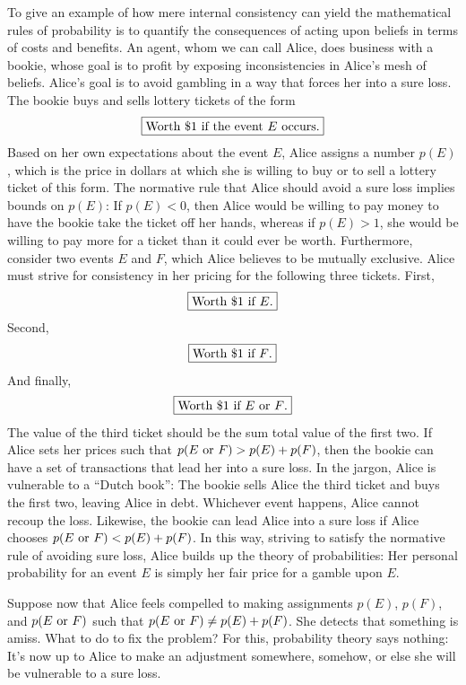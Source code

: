 \documentclass[aps,pra,superscriptaddress,10pt,tightenlines,twocolumn,nofootinbib]{revtex4}
\newcommand{\ticket}[1]{\boxed{\hbox{#1}}}
\begin{document}
To give an example of how mere internal consistency can yield the mathematical rules of probability is to quantify the consequences of acting upon beliefs in terms of costs and benefits.  An agent, whom we can call Alice, does business with a bookie, whose goal is to profit by exposing inconsistencies in Alice's mesh of beliefs.  Alice's goal is to avoid gambling in a way that forces her into a sure loss.  The bookie buys and sells lottery tickets of the form
\begin{equation}
\ticket{Worth \$1 if the event $E$ occurs.}
\end{equation}
Based on her own expectations about the event $E$, Alice assigns a number $p(E)$, which is the price in dollars at which she is willing to buy or to sell a lottery ticket of this form.  The normative rule that Alice should avoid a sure loss implies bounds on $p(E)$: If $p(E) < 0$, then Alice would be willing to pay money to have the bookie take the ticket off her hands, whereas if $p(E) > 1$, she would be willing to pay more for a ticket than it could ever be worth.  Furthermore, consider two events $E$ and $F$, which Alice believes to be mutually exclusive. Alice must strive for consistency in her pricing for the following three tickets.  First,
\begin{equation}
\ticket{Worth \$1 if $E$.}
\end{equation}
Second,
\begin{equation}
\ticket{Worth \$1 if $F$.}
\end{equation}
And finally,
\begin{equation}
\ticket{Worth \$1 if $E$ or $F$.}
\end{equation}
The value of the third ticket should be the sum total value of the first two.  If Alice sets her prices such that $p(E \hbox{ or } F) > p(E) + p(F)$, then the bookie can have a set of transactions that lead her into a sure loss.  In the jargon, Alice is vulnerable to a ``Dutch book'':  The bookie sells Alice the third ticket and buys the first two, leaving Alice in debt.  Whichever event happens, Alice cannot recoup the loss.  Likewise, the bookie can lead Alice into a sure loss if Alice chooses $p(E \hbox{ or } F) < p(E) + p(F)$.  In this way, striving to satisfy the normative rule of avoiding sure loss, Alice builds up the theory of probabilities:  Her personal probability for an event $E$ is simply her fair price for a gamble upon $E$.

Suppose now that Alice feels compelled to making assignments $p(E)$, $p(F)$, and $p(E \hbox{ or } F)$ such that $p(E \hbox{ or } F) \ne p(E) + p(F)$.  She detects that something is amiss. What to do to fix the problem?  For this, probability theory says nothing:  It's now up to Alice to make an adjustment somewhere, somehow, or else she will be vulnerable to a sure loss.
\end{document}
